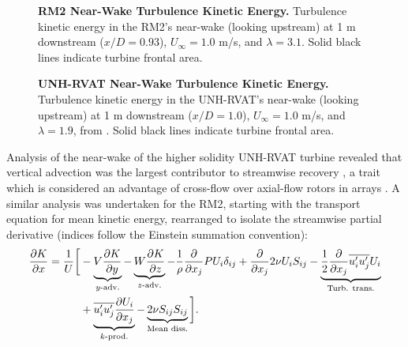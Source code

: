 \documentclass[10pt,letterpaper]{article}
\def \p{\partial}
\begin{document}
\begin{figure}

    \caption{{\bf RM2 Near-Wake Turbulence Kinetic Energy.} Turbulence kinetic
        energy in the RM2's near-wake (looking upstream) at 1 m downstream
        ($x/D=0.93$), $U_\infty=1.0$ m/s, and $\lambda=3.1$. Solid black lines
        indicate turbine frontal area.}

    \label{fig:kcont}
\end{figure}

\begin{figure}

    \caption{{\bf UNH-RVAT Near-Wake Turbulence Kinetic Energy.} Turbulence
        kinetic energy in the UNH-RVAT's near-wake (looking upstream) at 1 m
        downstream ($x/D=1.0$), $U_\infty=1.0$ m/s, and $\lambda=1.9$, from
        \cite{Bachant2016-Energies}. Solid black lines indicate turbine frontal
        area.}

    \label{fig:rvat-kcont}
\end{figure}

Analysis of the near-wake of the higher solidity UNH-RVAT turbine revealed that
vertical advection was the largest contributor to streamwise recovery
\cite{Bachant2015-JoT}, a trait which is considered an advantage of cross-flow
over axial-flow rotors in arrays \cite{Kinzel2012}. A similar analysis was
undertaken for the RM2, starting with the transport equation for mean kinetic
energy, rearranged to isolate the streamwise partial derivative (indices follow
the Einstein summation convention):
\begin{equation}
    \begin{split}
        \frac{\p K}{\p x}
        =
        \frac{1}{U}
        \bigg{[}
        & - \underbrace{V \frac{\p K}{\p y}}_{y\text{-adv.}}
        - \underbrace{W \frac{\p K}{\p z}}_{z\text{-adv.}}
        - \frac{1}{\rho}\frac{\p}{\p x_j} P U_i \delta_{ij}
        + \frac{\p}{\p x_j} 2 \nu U_i S_{ij}
        - \underbrace{
            \frac{1}{2}\frac{\p}{\p x_j} \overline{u_i' u_j'} U_i
        }_{\text{Turb. trans.}} \\
        & +
        \underbrace{
            \overline{u_i' u_j'} \frac{\p U_i}{\p x_j}
        }_{k\text{-prod.}}
        -
        \underbrace{
            2 \nu S_{ij}S_{ij}
        }_{\text{Mean diss.}}
        \bigg{]}.
    \end{split}
    \label{eq:K-full}
\end{equation}
\end{document}
